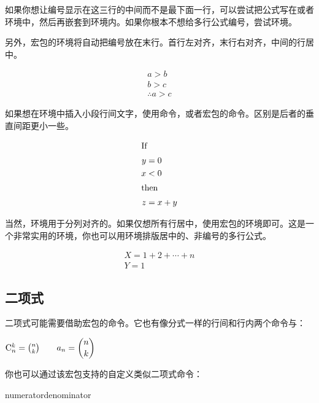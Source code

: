 如果你想让编号显示在这三行的中间而不是最下面一行，可以尝试把公式写在或者环境中，然后再嵌套到环境内。如果你根本不想给多行公式编号，尝试环境。

另外，宏包的环境将自动把编号放在末行。首行左对齐，末行右对齐，中间的行居中。
\begin{codeshow}
\begin{multline}
a>b \\
b>c \\
\therefore a>c
\end{multline}
\end{codeshow}

如果想在环境中插入小段行间文字，使用命令，或者宏包的命令。区别是后者的垂直间距更小一些。

\begin{codeshow}
\begin{align*}
\shortintertext{If}
 y &= 0 \\
 x &< 0\\
\shortintertext{then}
 z &= x+y
\end{align*}
\end{codeshow}

当然，环境用于分列对齐的。如果仅想所有行居中，使用宏包的环境即可。这是一个非常实用的环境，你也可以用环境排版居中的、非编号的多行公式。

\begin{codeshow}
\begin{gather}
  X=1+2+\cdots+n \\
  Y=1
\end{gather}
\end{codeshow}

\subsection{二项式}
\label{subsec:binom}
二项式可能需要借助宏包的命令。它也有像分式一样的行间和行内两个命令与：

\begin{codeshow}
$\mathrm{C}_n^k=\binom{n}{k}
\qquad a_n=\dbinom{n}{k}$
\end{codeshow}

你也可以通过该宏包支持的自定义类似二项式命令：
\begin{latex}
{numerator}{denominator}
\newcommand{\Bfrac}[2]{\genfrac{[}{]}{0pt}{}{#1}{#2}}
\end{latex}

